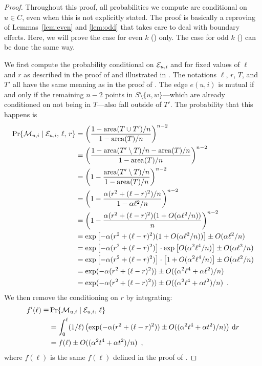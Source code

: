 \documentclass{patmorin}
\DeclareMathOperator{\area}{area}
\begin{document}
\begin{proof}
Throughout this proof, all probabilities we compute are conditional on
$u\in C$, even when this is not explicitly stated.  The proof is basically
a reproving of Lemmas~\ref{lem:even} and \ref{lem:odd} that takes care to
deal with boundary effects.  Here, we will prove the case for even $k$
() only.  The case for odd $k$ () can be done
the same way.

We first compute the probability conditional on $\mathcal{E}_{u,i}$ and for fixed
values of $\ell$ and $r$ as described in the proof of 
and illustrated in .  The notations $\ell$, $r$, $T$,
and $T'$ all have the same meaning as in the proof of .
The edge $e(u,i)$ is mutual if and only if the remaining $n-2$ points
in $S\setminus\{u,w\}$---which are already conditioned on not being in
$T$---also fall outside of $T'$.  The probability that this happens is
\begin{align}
   \Pr\{\mui\mid\eui,\,\ell,\, r\}
        & = \left(\frac{1-\area(T\cup T')/n}{1-\area(T)/n}\right)^{n-2} 
		\notag \\
        & = \left(\frac{1-\area(T'\setminus T)/n - \area(T)/n}
             {1-\area(T)/n}\right)^{n-2} \notag \\
        & = \left(1-\frac{\area(T'\setminus T)/n}{1-\area(T)/n}\right)^{n-2}
		\notag  \\
        & = \left(1-\frac{\alpha(r^2+(\ell-r)^2)/n}
                       {1-\alpha\ell^2/n}\right)^{n-2} \notag \\
        & = \left(1-\frac{\alpha(r^2+(\ell-r)^2)
               (1+O(\alpha\ell^2/n))}{n} \right)^{n-2} \notag \\
        & = \exp\left[-\alpha(r^2+(\ell-r)^2)(1+O(\alpha\ell^2/n))\right]
         \pm O(\alpha\ell^2/n) \notag \\
        & = \exp\left[-\alpha(r^2+(\ell-r)^2)\right]\cdot\exp\left[O(\alpha^2\ell^4/n)\right]
            \pm O(\alpha\ell^2/n) \eqlabel{blech} \\
        & = \exp\left[-\alpha(r^2+(\ell-r)^2)\right]\cdot\left[1+O(\alpha^2\ell^4/n)\right] 
            \pm O(\alpha\ell^2/n) \eqlabel{blech} \\
        & = \exp(-\alpha(r^2+(\ell-r)^2))
            \pm O((\alpha^2\ell^4+\alpha\ell^2)/n) \notag \\
        & = \exp(-\alpha(r^2+(\ell-r)^2))
            \pm O((\alpha^2 t^4+\alpha t^2)/n) \enspace . \notag
\end{align}
We then remove the conditioning on $r$ by integrating:
\begin{align*}
   f'(\ell) \equiv & \Pr\{\mathcal{M}_{u,i}\mid\mathcal{E}_{u,i},\,\ell\} \\
     & = \int_0^\ell(1/\ell)\left(\exp(-\alpha(r^2+(\ell-r)^2)) 
           \pm O((\alpha^2 t^4+\alpha t^2)/n)\right)\,\mathrm{d}r \\
     & = f(\ell) \pm O((\alpha^2 t^4+\alpha t^2)/n) \enspace ,
\end{align*}
where $f(\ell)$ is the same $f(\ell)$ defined in the proof of .


\end{proof}
\end{document}
